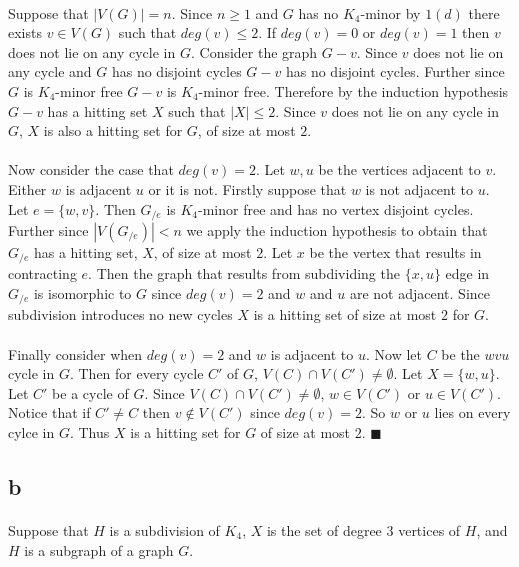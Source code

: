 \documentclass[letterpaper,12pt,oneside,onecolumn]{report}
\begin{document}
\paragraph{}
Suppose that $|V(G)| = n$. Since $n \geq 1$ and $G$ has no $K_4$-minor by $1(d)$ there exists $v \in V(G)$ such that $deg(v) \leq 2$. If $deg(v) = 0$ or $deg(v) = 1$ then $v$ does not lie on any cycle in $G$. Consider the graph $G - v$. Since $v$ does not lie on any cycle and $G$ has no disjoint cycles $G-v$ has no disjoint cycles. Further since $G$ is $K_4$-minor free $G-v$ is $K_4$-minor free. Therefore by the induction hypothesis $G-v$ has a hitting set $X$ such that $|X| \leq 2$. Since $v$ does not lie on any cycle in $G$, $X$ is also a hitting set for $G$, of size at most $2$.
\paragraph{}
Now consider the case that $deg(v) = 2$. Let $w, u$ be the vertices adjacent to $v$. Either $w$ is adjacent $u$ or it is not. Firstly suppose that $w$ is not adjacent to $u$. Let $e = \{w,v\}$. Then $G_{/e}$ is $K_4$-minor free and has no vertex disjoint cycles. Further since $|V(G_{/e})| < n$ we apply the induction hypothesis to obtain that $G_{/e}$ has a hitting set, $X$, of size at most $2$. Let $x$ be the vertex that results in contracting $e$. Then the graph that results from subdividing the $\{x, u\}$ edge in $G_{/e}$ is isomorphic to $G$ since $deg(v)=2$ and $w$ and $u$ are not adjacent. Since subdivision introduces no new cycles $X$ is a hitting set of size at most $2$ for $G$.
\paragraph{}
Finally consider when $deg(v) = 2$ and $w$ is adjacent to $u$. Now let $C$ be the $wvu$ cycle in $G$. Then for every cycle $C'$ of $G$, $V(C) \cap V(C') \neq \emptyset$. Let $X = \{w,u\}$. Let $C'$ be a cycle of $G$. Since $V(C) \cap V(C') \neq \emptyset$, $w \in V(C')$ or $u \in V(C')$. Notice that if $C' \neq C$ then $v \not \in V(C')$ since $deg(v) = 2$. So $w$ or $u$ lies on every cylce in $G$. Thus $X$ is a hitting set for $G$ of size at most $2$. $\blacksquare$
\subsection*{b}
\paragraph{}
Suppose that $H$ is a subdivision of $K_4$, $X$ is the set of degree $3$ vertices of $H$, and $H$ is a subgraph of a graph $G$.
\end{document}
